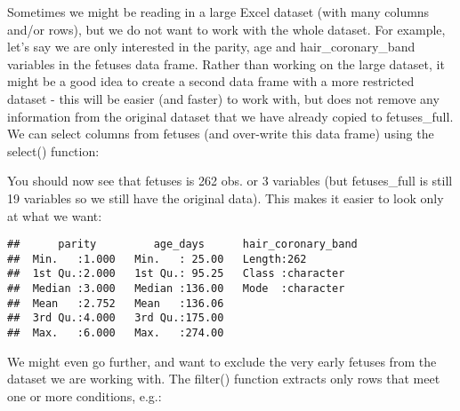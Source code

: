 \documentclass[
]{article}
\newenvironment{Shaded}{\begin{snugshade}}{\end{snugshade}}
\newcommand{\DecValTok}[1]{\textcolor[rgb]{0.00,0.00,0.81}{#1}}
\newcommand{\KeywordTok}[1]{\textcolor[rgb]{0.13,0.29,0.53}{\textbf{#1}}}
\newcommand{\NormalTok}[1]{#1}
\newcommand{\OperatorTok}[1]{\textcolor[rgb]{0.81,0.36,0.00}{\textbf{#1}}}
\newcommand{\StringTok}[1]{\textcolor[rgb]{0.31,0.60,0.02}{#1}}
\begin{document}
Sometimes we might be reading in a large Excel dataset (with many
columns and/or rows), but we do not want to work with the whole dataset.
For example, let's say we are only interested in the parity, age and
hair\_coronary\_band variables in the fetuses data frame. Rather than
working on the large dataset, it might be a good idea to create a second
data frame with a more restricted dataset - this will be easier (and
faster) to work with, but does not remove any information from the
original dataset that we have already copied to fetuses\_full. We can
select columns from fetuses (and over-write this data frame) using the
select() function:

\begin{Shaded}
\end{Shaded}

You should now see that fetuses is 262 obs. or 3 variables (but
fetuses\_full is still 19 variables so we still have the original data).
This makes it easier to look only at what we want:

\begin{Shaded}
\end{Shaded}

\begin{verbatim}
##      parity         age_days      hair_coronary_band
##  Min.   :1.000   Min.   : 25.00   Length:262        
##  1st Qu.:2.000   1st Qu.: 95.25   Class :character  
##  Median :3.000   Median :136.00   Mode  :character  
##  Mean   :2.752   Mean   :136.06                     
##  3rd Qu.:4.000   3rd Qu.:175.00                     
##  Max.   :6.000   Max.   :274.00
\end{verbatim}

We might even go further, and want to exclude the very early fetuses
from the dataset we are working with. The filter() function extracts
only rows that meet one or more conditions, e.g.:

\begin{Shaded}
\end{Shaded}
\end{document}

